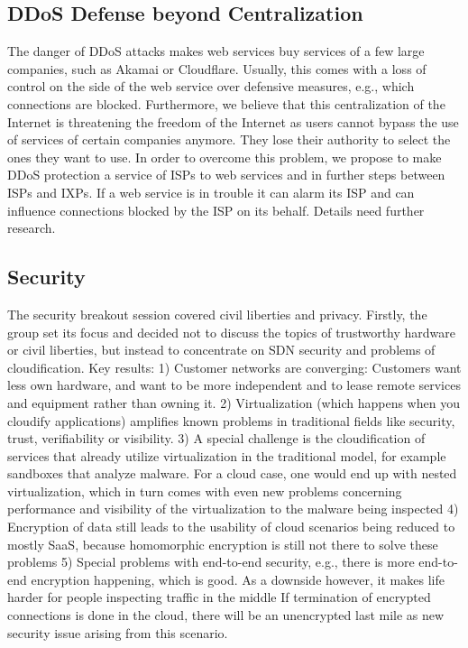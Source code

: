 \subsection{DDoS Defense beyond Centralization}

The danger of \ac{DDoS} attacks makes web services buy services of a few large
companies, such as Akamai or Cloudflare. Usually, this comes with a loss of
control on the side of the web service over defensive measures, e.g., which
connections are blocked.
Furthermore, we believe that this centralization of the
Internet is threatening the freedom of the Internet as users cannot bypass the
use of services of certain companies anymore. They lose their authority to
select the ones they want to use. In order to overcome this problem, we propose to
make \ac{DDoS} protection a service of ISPs to web services and in further
steps between ISPs and IXPs. If a web service is in trouble it can alarm its
ISP and can influence connections blocked by the ISP on its behalf. Details
need further research.

\subsection{Security}

The security breakout session covered civil liberties and privacy. Firstly,
the group set its focus and decided not to discuss the topics of trustworthy
hardware or civil liberties, but instead to concentrate on \ac{SDN} security
and problems of cloudification. Key results: 1) Customer networks are
converging:  Customers want less own hardware, and want to be more independent
and to lease remote services and equipment rather than owning it.  2)
Virtualization (which happens when you cloudify applications) amplifies known
problems in traditional fields like security, trust, verifiability or
visibility.  3) A special challenge is the cloudification of services that
already utilize virtualization in the traditional model, for example sandboxes
that analyze malware.  For a cloud case, one would end up with nested
virtualization, which in turn comes with even new problems concerning
performance and visibility of the virtualization to the malware being
inspected 4) Encryption of data still leads to the usability of cloud
scenarios being reduced to mostly SaaS, because homomorphic encryption is
still not there to solve these problems 5) Special problems with end-to-end
security, e.g., there is more end-to-end encryption happening, which is good.
As a downside however, it makes life harder for people inspecting traffic in
the middle If termination of encrypted connections is done in the cloud, there
will be an unencrypted last mile as new security issue arising from this
scenario.

